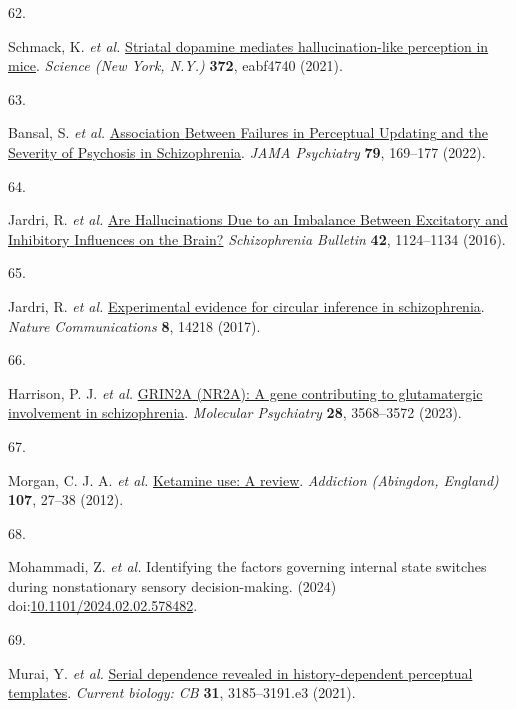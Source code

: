 \documentclass[
]{article}
\newlength{\cslhangindent}
\newlength{\csllabelwidth}
\newenvironment{CSLReferences}[2] %
 {\begin{list}{}{%
  \setlength{\itemindent}{0pt}
  \setlength{\leftmargin}{0pt}
  \setlength{\parsep}{0pt}
  \ifodd #1
   \setlength{\leftmargin}{\cslhangindent}
   \setlength{\itemindent}{-1\cslhangindent}
  \fi
  \setlength{\itemsep}{#2\baselineskip}}}
 {\end{list}}
\newcommand{\CSLLeftMargin}[1]{\parbox[t]{\csllabelwidth}{\strut#1\strut}}
\newcommand{\CSLRightInline}[1]{\parbox[t]{\linewidth - \csllabelwidth}{\strut#1\strut}}
\begin{document}
\begin{CSLReferences}{0}{0}
\CSLLeftMargin{62. }%
\CSLRightInline{Schmack, K. \emph{et al.}
\href{https://doi.org/10.1126/science.abf4740}{Striatal dopamine
mediates hallucination-like perception in mice}. \emph{Science (New
York, N.Y.)} \textbf{372}, eabf4740 (2021).}

\CSLLeftMargin{63. }%
\CSLRightInline{Bansal, S. \emph{et al.}
\href{https://doi.org/10.1001/jamapsychiatry.2021.3482}{Association
{Between} {Failures} in {Perceptual} {Updating} and the {Severity} of
{Psychosis} in {Schizophrenia}}. \emph{JAMA Psychiatry} \textbf{79},
169--177 (2022).}

\CSLLeftMargin{64. }%
\CSLRightInline{Jardri, R. \emph{et al.}
\href{https://doi.org/10.1093/schbul/sbw075}{Are {Hallucinations} {Due}
to an {Imbalance} {Between} {Excitatory} and {Inhibitory} {Influences}
on the {Brain}?} \emph{Schizophrenia Bulletin} \textbf{42}, 1124--1134
(2016).}

\CSLLeftMargin{65. }%
\CSLRightInline{Jardri, R. \emph{et al.}
\href{https://doi.org/10.1038/ncomms14218}{Experimental evidence for
circular inference in schizophrenia}. \emph{Nature Communications}
\textbf{8}, 14218 (2017).}

\CSLLeftMargin{66. }%
\CSLRightInline{Harrison, P. J. \emph{et al.}
\href{https://doi.org/10.1038/s41380-023-02265-y}{{GRIN2A} ({NR2A}): A
gene contributing to glutamatergic involvement in schizophrenia}.
\emph{Molecular Psychiatry} \textbf{28}, 3568--3572 (2023).}

\CSLLeftMargin{67. }%
\CSLRightInline{Morgan, C. J. A. \emph{et al.}
\href{https://doi.org/10.1111/j.1360-0443.2011.03576.x}{Ketamine use: A
review}. \emph{Addiction (Abingdon, England)} \textbf{107}, 27--38
(2012).}

\CSLLeftMargin{68. }%
\CSLRightInline{Mohammadi, Z. \emph{et al.} Identifying the factors
governing internal state switches during nonstationary sensory
decision-making. (2024)
doi:\href{https://doi.org/10.1101/2024.02.02.578482}{10.1101/2024.02.02.578482}.}

\CSLLeftMargin{69. }%
\CSLRightInline{Murai, Y. \emph{et al.}
\href{https://doi.org/10.1016/j.cub.2021.05.006}{Serial dependence
revealed in history-dependent perceptual templates}. \emph{Current
biology: CB} \textbf{31}, 3185--3191.e3 (2021).}


\end{CSLReferences}
\end{document}
